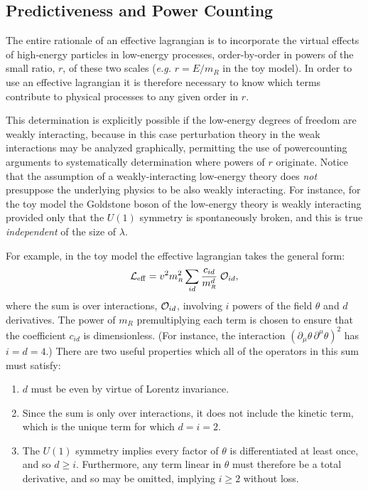 \documentclass[12pt]{article}
\def\sst{\scriptscriptstyle}
\begin{document}
\subsection{Predictiveness and Power Counting}

The entire rationale of an effective lagrangian is
to incorporate the virtual effects of high-energy particles
in low-energy processes, order-by-order in powers of
the small ratio, $r$, of these two scales ({\it e.g.}
$r = E/m_{\sst R}$ in the toy model). In order to 
use an effective lagrangian it is therefore necessary
to know which terms contribute to physical processes
to any given order in $r$. 

This determination is explicitly possible if the low-energy degrees 
of freedom are weakly interacting, because in this case perturbation
theory in the weak interactions may be analyzed graphically,
permitting the use of powercounting arguments to
systematically determination where powers
of $r$ originate. Notice that the assumption of a weakly-interacting
low-energy theory does {\it not} presuppose the underlying
physics to be also weakly interacting. For instance, for the
toy model the Goldstone boson of the low-energy theory is
weakly interacting provided only that the $U(1)$ symmetry 
is spontaneously broken, and this is true 
{\it independent} of the size of $\lambda$. 

For example, in the toy model the effective lagrangian takes the
general form: 
%
\begin{equation}
\label{genformLeff}
{\cal L}_{\rm eff} = v^2 m_{\sst R}^2 \sum_{id} {c_{id} 
\over m_{\sst R}^d} \; {\cal O}_{id},
\end{equation}
%
where the sum is over interactions, ${\cal O}_{id}$, 
involving $i$ powers of the field $\theta$ and $d$ 
derivatives. The power of $m_{\sst R}$ premultiplying
each term is chosen to ensure that the coefficient 
$c_{id}$ is dimensionless. (For instance, the interaction
$(\partial_\mu \theta \, \partial^\mu \theta)^2$ has
$i = d = 4$.) There are two useful properties which
all of the operators in this sum must satisfy:
%
\begin{enumerate}
\item
$d$ must be even by virtue of Lorentz invariance.
%
\item
Since the sum is only over interactions,
it does not include the kinetic term, which is the unique
term for which $d=i=2$.
%
\item
The $U(1)$ symmetry implies every factor of $\theta$
is differentiated at least once, and so $d \ge i$. Furthermore,
any term linear in $\theta$ must therefore be a total 
derivative, and so may be omitted, implying 
$i \ge 2$ without loss. 
\end{enumerate}
\end{document}
